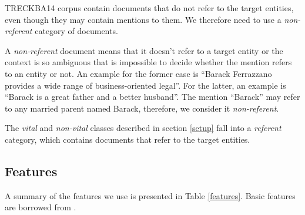 \documentclass{article}
\begin{document}
TRECKBA14 corpus contain documents that do not refer to the target entities, even though they may contain mentions to them. We therefore need to use a \emph{non-referent} category of documents. 

A \emph{non-referent} document means that it doesn't refer to a target entity or the context is so ambiguous that is impossible to decide whether the mention refers to an entity or not. An example for the former case is ``Barack Ferrazzano provides a wide range of business-oriented legal''. For the latter, an example is ``Barack is a great father and a better husband''. The mention ``Barack'' may refer to any married parent named Barack, therefore, we consider it \emph{non-referent}.

The \emph{vital} and \emph{non-vital} classes described in section \ref{setup} fall into a \emph{referent} category, which contains documents that refer to the target entities.

\subsection{Features}
\label{feat}

A summary of the features we use is presented in Table \ref{features}. Basic features are borrowed from \cite{jingang13}.

\end{document}
